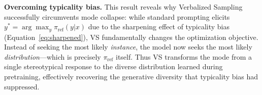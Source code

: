 \textbf{Overcoming typicality bias.} This result reveals why Verbalized Sampling successfully circumvents mode collapse: while standard prompting elicits $y^* = \arg\max_y \pi_\text{ref}(y|x)$ due to the sharpening effect of typicality bias (Equation~\eqref{eq:sharpened}), VS fundamentally changes the optimization objective. Instead of seeking the most likely \emph{instance}, the model now seeks the most likely \emph{distribution}—which is precisely $\pi_\text{ref}$ itself. Thus VS transforms the mode from a single stereotypical response to the diverse distribution learned during pretraining, effectively recovering the generative diversity that typicality bias had suppressed.







